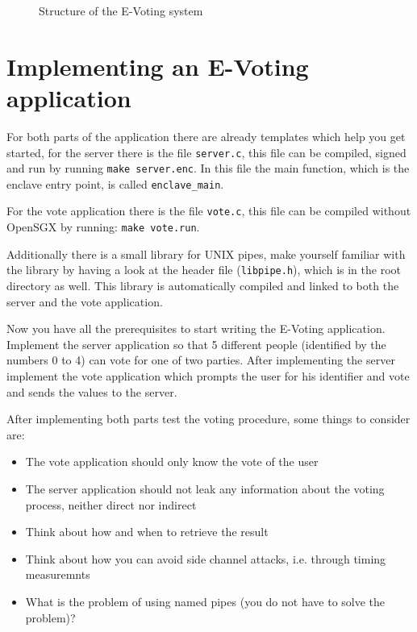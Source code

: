 \documentclass{uulm-assignment}
\begin{document}
    \begin{figure}[h]
        \centering
        \caption{Structure of the E-Voting system}
        \label{fig:struct}
    \end{figure}

    \section{Implementing an E-Voting application}
    For both parts of the application there are already templates which help you get
    started, for the server there is the file \texttt{server.c}, this file
    can be compiled, signed and run by running \texttt{make server.enc}.
    In this file the main function, which is the enclave entry point, is called \texttt{enclave\_main}.

    For the vote application there is the file \texttt{vote.c}, this
    file can be compiled without OpenSGX by running: \texttt{make vote.run}.    

    Additionally there is a small library for UNIX pipes, make yourself familiar
    with the library by having a look at the header file (\texttt{libpipe.h}),
    which is in the root directory as well. This library is automatically
    compiled and linked to both the server and the vote application.

    Now you have all the prerequisites to start writing the E-Voting application.
    Implement the server application so that 5 different people (identified by the numbers 0 to 4) can vote for one
    of two parties.
    After implementing the server implement the vote application which prompts the user for his identifier and vote
    and sends the values to the server.

    After implementing both parts test the voting procedure, some things to consider are: 
    \begin{itemize}
        \item The vote application should only know the vote of the user
        \item The server application should not leak any information about the voting process, neither direct nor indirect
        \item Think about how and when to retrieve the result
        \item Think about how you can avoid side channel attacks, i.e. through timing measuremnts
        \item What is the problem of using named pipes (you do not have to solve the problem)?
    \end{itemize}
\end{document}
